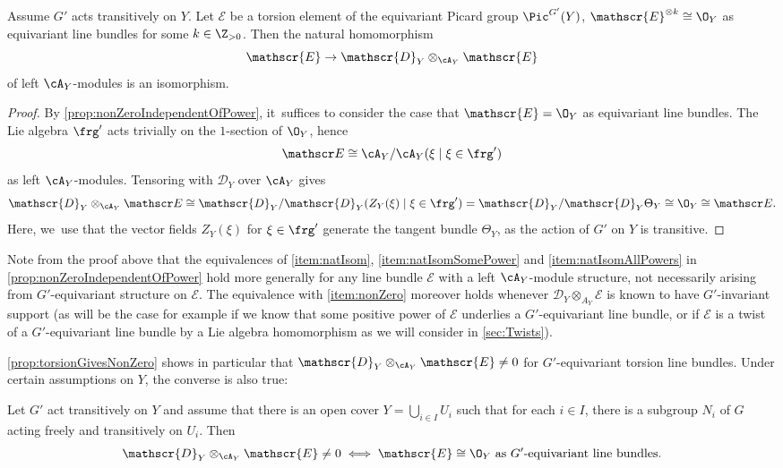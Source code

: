 \begin{cor} \label{prop:torsionGivesNonZero}
Assume $G'$ acts transitively on $Y$. Let $\mathscr{E}$ be a torsion element of the equivariant Picard group $\Pic^{G'}(Y)$, \ie $\mathscr{E}^{\otimes k} \cong \O_Y$ as equivariant line bundles for some $k \in \Z_{>0}$. Then
the natural homomorphism
\[
\mathscr{E} \to \mathscr{D}_Y \otimes_{\cA_Y} \mathscr{E}
\]
of left $\cA_Y$\nobreakdash-mod\-ules is an isomorphism.
\end{cor}

\begin{proof}
By \cref{prop:nonZeroIndependentOfPower}, it~suffices to consider the case that $\mathscr{E} = \O_Y$ as equivariant line bundles. The Lie algebra $\frg'$ acts trivially on the $1$-section of $\O_Y$, hence
\[
\mathscr E \cong \cA_Y/\cA_Y(\xi \mid \xi \in \frg')
\]
as left $\cA_Y$\nobreakdash-mod\-ules. Tensoring with $\mathscr{D}_Y$ over $\cA_Y$ gives
\[
\mathscr{D}_Y \otimes_{\cA_Y} \mathscr E \cong \mathscr{D}_Y/\mathscr{D}_Y(Z_Y(\xi) \mid \xi \in \frg') = \mathscr{D}_Y/\mathscr{D}_Y \Theta_Y \cong \O_Y \cong \mathscr E.
\]
Here, we~use that the vector fields $Z_Y(\xi)$ for $\xi \in \frg'$ generate the tangent bundle $\Theta_Y$, as the action of $G'$ on $Y$ is transitive.
\end{proof}

\begin{rmk} \label{rem:torsionGivesNonZero}
Note from the proof above that the equivalences of \eqref{item:natIsom}, \eqref{item:natIsomSomePower} and \eqref{item:natIsomAllPowers} in \cref{prop:nonZeroIndependentOfPower} hold more generally for any line bundle $\mathscr{E}$ with a left $\cA_Y$\nobreakdash-mod\-ule structure, not necessarily arising from $G'$-equivariant structure on $\mathscr{E}$. The equivalence with \eqref{item:nonZero} moreover holds whenever $\mathscr D_Y \otimes_{A_Y} \mathscr E$ is known to have $G'$-invariant support (as will be the case for example if we know that some positive power of $\mathscr E$ underlies a $G'$-equivariant line bundle, or if $\mathscr E$ is a twist of a $G'$-equivariant line bundle by a Lie algebra homomorphism as we will consider in \cref{sec:Twists}).
\end{rmk}

\cref{prop:torsionGivesNonZero} shows in particular that $\mathscr{D}_Y \otimes_{\cA_Y} \mathscr{E} \neq 0$ for $G'$-equivariant torsion line bundles. Under certain assumptions on $Y$, the converse is also true:

\begin{prop} \label{prop:nonTorsionGivesZero}
Let $G'$ act transitively on $Y$ and assume that there is an open cover $Y = \bigcup_{i \in I} U_i$ such that for each $i \in I$, there is a subgroup $N_i$ of $G$ acting freely and transitively on $U_i$. Then
\[
\mathscr{D}_Y \otimes_{\cA_Y} \mathscr{E} \neq 0
\iff
\mathscr{E} \cong \O_Y \text{ as $G'$-equivariant line bundles}.
\]
\end{prop}

